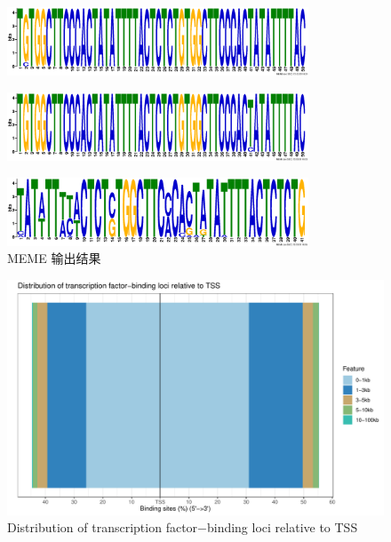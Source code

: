 \documentclass[UTF8]{ctexart}
\begin{document}

\begin{figure}
	\centering
	\includegraphics[width=0.8\textwidth]{img/meme_out/logo1.eps}
\end{figure}

\begin{figure}
	\centering
	\includegraphics[width=0.8\textwidth]{img/meme_out/logo2.eps}
\end{figure}

\begin{figure}
	\centering
	\includegraphics[width=0.8\textwidth]{img/meme_out/logo3.eps}
	\caption{MEME 输出结果}
\end{figure}


\begin{figure}[htb]
	\centering
	\includegraphics[width=\textwidth]{img/peak_distrubution.pdf}
    \caption{Distribution of transcription factor−binding loci relative to TSS}
\end{figure}
\end{document}
